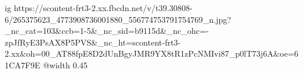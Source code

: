  
 
 
 
 

\ifcmt
  ig https://scontent-frt3-2.xx.fbcdn.net/v/t39.30808-6/265375623_4773908736001880_556774753791754769_n.jpg?_nc_cat=103&ccb=1-5&_nc_sid=b9115d&_nc_ohc=-zpJfRyE3PsAX8P5PVS&_nc_ht=scontent-frt3-2.xx&oh=00_AT88fpE8D2dUnBgyJMR9YX8tR1zPcNMIvi87_p0lT73j6A&oe=61CA7F9E
  @width 0.45
\fi

